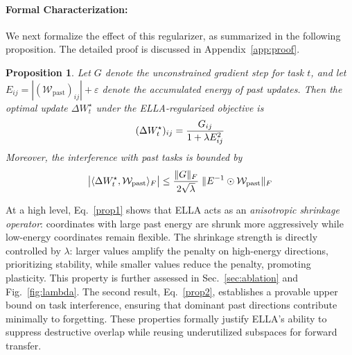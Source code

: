 \documentclass[11pt]{article}
\newtheorem{proposition}{Proposition}
\begin{document}
\paragraph{Formal Characterization:} 
We next formalize the effect of this regularizer, as summarized in the following proposition. The detailed proof is discussed in Appendix~\ref{app:proof}. 

\begin{proposition}
Let $G$ denote the unconstrained gradient step for task $t$, and let 
$E_{ij} = |(\mathcal{W}_{\text{past}})_{ij}| + \varepsilon$ denote the accumulated 
energy of past updates. Then the optimal update $\Delta W^\star_t$ under the ELLA-regularized objective is 
\vspace{-9pt}
\begin{equation}
(\Delta W^\star_t)_{ij} = \frac{G_{ij}}{1 + \lambda E_{ij}^2}
\label{prop1}
\vspace{-9pt}
\end{equation}
Moreover, the interference with past tasks is bounded by
\vspace{-9pt}
\begin{equation}
\bigl|\langle \Delta W^\star_t, \mathcal{W}_{\text{past}}\rangle_F\bigr|
\leq \frac{\|G\|_F}{2\sqrt{\lambda}} \;\|E^{-1}\odot \mathcal{W}_{\text{past}}\|_F
\label{prop2}
\vspace{-4pt}
\end{equation}
\end{proposition}

At a high level, Eq.~\ref{prop1} shows that ELLA acts as an \emph{anisotropic shrinkage operator}: 
coordinates with large past energy are shrunk more aggressively 
while low-energy coordinates remain flexible. The shrinkage strength is directly controlled by $\lambda$: larger values amplify the penalty on high-energy directions, prioritizing stability, while smaller values reduce the penalty, promoting plasticity. This property is further assessed in Sec.~\ref{sec:ablation} and Fig.~\ref{fig:lambda}.
The second result, Eq.~\ref{prop2}, establishes a provable upper bound on task interference, ensuring that 
dominant past directions contribute minimally to forgetting. These properties 
formally justify ELLA’s ability to suppress destructive overlap while reusing 
underutilized subspaces for forward transfer.
\end{document}
